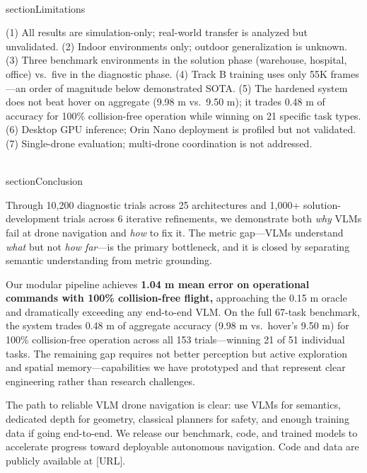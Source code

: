 \documentclass[conference]{IEEEtran}
\begin{document}
\\section{Limitations}\label{x.-limitations}

(1) All results are simulation-only; real-world transfer is analyzed but
unvalidated. (2) Indoor environments only; outdoor generalization is
unknown. (3) Three benchmark environments in the solution phase
(warehouse, hospital, office) vs.~five in the diagnostic phase. (4)
Track B training uses only 55K frames---an order of magnitude below
demonstrated SOTA. (5) The hardened system does not beat hover on
aggregate (9.98 m vs.~9.50 m); it trades 0.48 m of accuracy for 100\%
collision-free operation while winning on 21 specific task types. (6)
Desktop GPU inference; Orin Nano deployment is profiled but not
validated. (7) Single-drone evaluation; multi-drone coordination is not
addressed.

\\section{Conclusion}\label{xi.-conclusion}

Through 10,200 diagnostic trials across 25 architectures and 1,000+
solution-development trials across 6 iterative refinements, we
demonstrate both \emph{why} VLMs fail at drone navigation and \emph{how}
to fix it. The metric gap---VLMs understand \emph{what} but not
\emph{how far}---is the primary bottleneck, and it is closed by
separating semantic understanding from metric grounding.

Our modular pipeline achieves \textbf{1.04 m mean error on operational
commands with 100\% collision-free flight,} approaching the 0.15 m
oracle and dramatically exceeding any end-to-end VLM. On the full
67-task benchmark, the system trades 0.48 m of aggregate accuracy (9.98
m vs.~hover's 9.50 m) for 100\% collision-free operation across all 153
trials---winning 21 of 51 individual tasks. The remaining gap requires
not better perception but active exploration and spatial
memory---capabilities we have prototyped and that represent clear
engineering rather than research challenges.

The path to reliable VLM drone navigation is clear: use VLMs for
semantics, dedicated depth for geometry, classical planners for safety,
and enough training data if going end-to-end. We release our benchmark,
code, and trained models to accelerate progress toward deployable
autonomous navigation. Code and data are publicly available at
{[}URL{]}.
\end{document}
